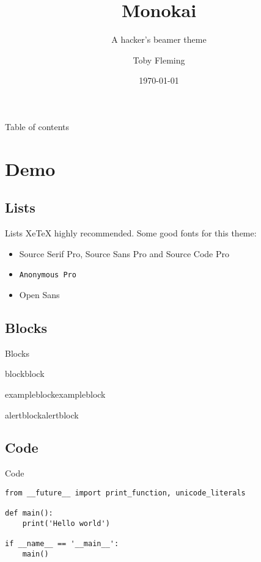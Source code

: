 \documentclass[xetex,12pt,aspectratio=169]{beamer}
\title{Monokai}
\subtitle{A hacker's beamer theme}
\date{\today}
\author{Toby Fleming}
\institute{School of Hard Knocks}
\begin{document}
\maketitle

\begin{frame}{Table of contents}
\tableofcontents
\end{frame}

\section{Demo}
\subsection{Lists}

\begin{frame}{Lists}
XeTeX \alert{highly} recommended. Some good fonts for this theme:
\vfill
\begin{itemize}
\item Source Serif Pro, Source Sans Pro and Source Code Pro
\item \texttt{Anonymous Pro}
\item Open Sans
\end{itemize}
\end{frame}

\subsection{Blocks}

\begin{frame}{Blocks}
\begin{block}{block}block\end{block}
\begin{exampleblock}{exampleblock}exampleblock\end{exampleblock}
\begin{alertblock}{alertblock}alertblock\end{alertblock}
\end{frame}

\subsection{Code}

\begin{frame}[fragile]{Code}
\begin{verbatim}
from __future__ import print_function, unicode_literals

def main():
    print('Hello world')

if __name__ == '__main__':
    main()
\end{verbatim}
\end{frame}
\end{document}

